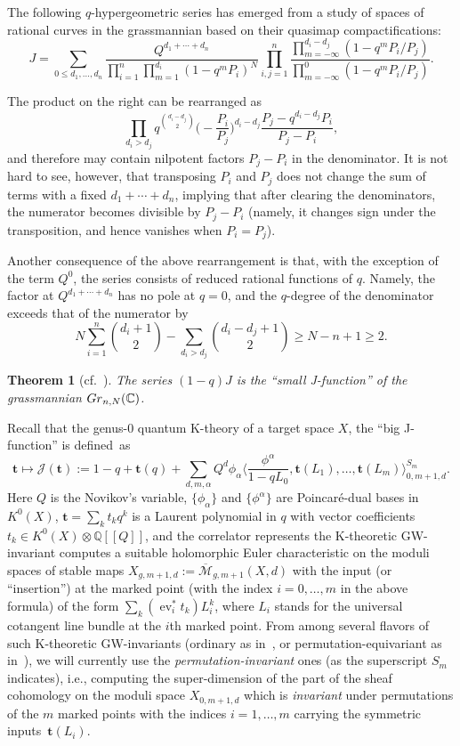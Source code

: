 \documentclass[11pt]{article}
\numberwithin{equation}{section}
\numberwithin{equation}{section}
\newtheorem{Theorem}{Theorem}[section]
\def\J{\mathcal J}
\def\M{{\overline{\mathcal M}}}
\def\QQ{\mathbb Q}
\def\CC{\mathbb C}
\def\a{\alpha}
\def\t{{\mathbf t}}
\def\lan{\langle}
\def\ran{\rangle}
\def\ev{\operatorname{ev}}
\begin{document}
The following $q$-hypergeometric series has emerged from a study of spaces of rational curves in the grassmannian based on their quasimap compactifications:
\[
J=\sum_{0\leq d_1,\dots,d_n}\frac{Q^{d_1+\cdots+ d_n}}{\prod_{i=1}^n\prod_{m=1}^{d_i}(1-q^mP_i)^N} \prod_{i,j=1}^n\frac{\prod_{m=-\infty}^{d_i-d_j}(1-q^mP_i/P_j)} {\prod_{m=-\infty}^0(1-q^mP_i/P_j)}.
\]

\begin{Remark}\label{rmk1}
The product on the right can be rearranged as
\[
\prod_{d_i>d_j} q^{\binom{d_i-d_j}{2}} \bigg(\!{-}\frac{P_i}{P_j}\bigg)^{d_i-d_j}\frac{P_j-q^{d_i-d_j}P_i}{P_j-P_i},
\]
and therefore may contain nilpotent factors $P_j-P_i$ in the denominator. It is not hard to see, however, that transposing $P_i$ and $P_j$ does not change the sum of terms with a fixed $d_1+\cdots +d_n$, implying that after clearing the denominators, the numerator becomes divisible by $P_j-P_i$ (namely, it changes sign under the transposition, and hence vanishes when $P_i=P_j$).
\end{Remark}

\begin{Remark}\label{rmk2}
Another consequence of the above rearrangement is that, with the exception of the term $Q^0$, the series consists of reduced rational functions of $q$. Namely, the factor at $Q^{d_1+\cdots+d_n}$ has no pole at $q=0$, and the $q$-degree of the denominator exceeds that of the numerator by
\[
N\sum_{i=1}^n\binom{d_i+1}{2}-\sum_{d_i>d_j}\binom{d_i-d_j+1}{2}\geq N-n+1\geq 2.
\]
\end{Remark}

\begin{Theorem}[{cf.~\cite{Taipale, Wen}}]\label{thm1}
The series $(1-q) J$ is the ``small J-function'' of the grassmannian ${\rm Gr}_{n,N}(\CC)$.
\end{Theorem}

Recall that the genus-0 quantum K-theory of a target space $X$, the ``big J-function'' is defi\-ned~as
\[
\t \mapsto \J(\t):=1-q+\t(q)+\sum_{d,m,\a} Q^d \phi_\a \bigg\lan \frac{\phi^\a}{1-qL_0},\t(L_1),\dots,\t(L_m)\bigg\ran_{0,m+1,d}^{S_m}.
\]
Here $Q$ is the Novikov's variable, $\{ \phi_\a \}$ and $\{ \phi^\a\}$ are Poincar{\'e}-dual bases in $K^0(X)$, $\t=\sum_k t_k q^k$ is a Laurent polynomial in $q$ with vector coefficients $t_k \in K^0(X)\otimes \QQ[[Q]]$, and the correlator represents the K-theoretic GW-invariant computes a suitable holomorphic Euler characteristic on the moduli spaces of stable maps $X_{g,m+1,d}:=\M_{g,m+1}(X,d)$ with the input (or ``insertion'') at the marked point (with the index $i=0,\dots,m$ in the above formula) of the form $\sum_k (\ev_i^*t_k) L_i^k$, where $L_i$ stands for the universal cotangent line bundle at the $i$th marked point. From among several flavors of such K-theoretic GW-invariants (ordinary as in~\cite{Givental-Tonita}, or permutation-equivariant as in~\cite{Givental:perm9}), we will currently use the {\em permutation-invariant} ones (as the superscript $S_m$ indicates), i.e., computing the super-dimension of the part of the sheaf cohomology on the moduli space $X_{0,m+1,d}$ which is {\em invariant} under permutations of the $m$ marked points with the indices $i=1,\dots,m$ carrying the symmetric inputs~$\t(L_i)$.
\end{document}
